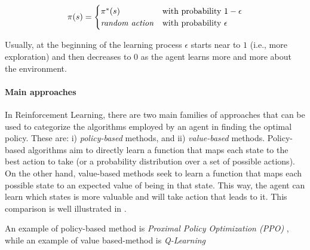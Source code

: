 \documentclass[12pt,a4paper,openright,twoside]{book}
\begin{document}
    $$
    \pi(s)=
    \begin{cases}
        \pi^*(s) & \text{with probability $1-\epsilon$} \\
        \text{\emph{random action}} & \text{with probability $\epsilon$}\\
    \end{cases} 
    $$ 

    Usually, at the beginning of the learning process $\epsilon$ starts near to $1$ (i.e., more exploration) and then decreases
    to $0$ as the agent learns more and more about the environment. 

\paragraph{Main approaches}

In Reinforcement Learning, there are two main families of approaches that can be used to categorize the 
    algorithms employed by an agent in finding the optimal policy. These are: 
    i) \emph{policy-based} methods, and 
    ii) \emph{value-based} methods.
    Policy-based algorithms aim to directly learn a function that maps each state to the best action to take 
    (or a probability distribution over a set of possible actions). On the other hand, value-based methods 
    seek to learn a function that maps each possible state to an expected value of being in that state. 
    This way, the agent can learn which states is more valuable and will take action that leads to it. 
    This comparison is well illustrated in .

An example of policy-based method is \emph{Proximal Policy Optimization (PPO)} \cite{ppo}, while an example of 
    value based-method is \emph{Q-Learning} \cite{QL}
\end{document}
